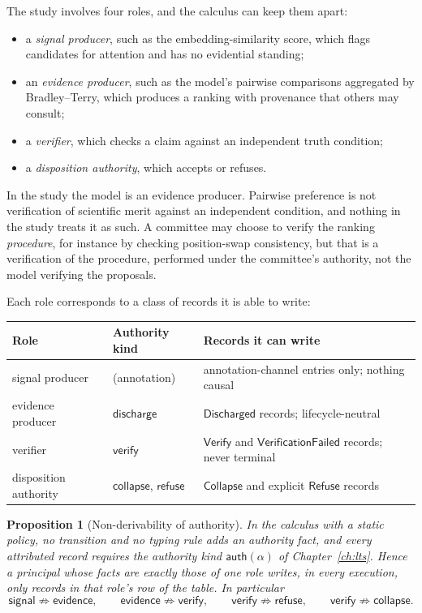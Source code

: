 \documentclass[11pt,openany]{book}
\newtheorem{proposition}[theorem]{Proposition}
\theoremstyle{remark}
\newcommand{\Refuse}{\mathsf{Refuse}}
\newcommand{\Verify}{\mathsf{Verify}}
\newcommand{\Collapse}{\mathsf{Collapse}}
\begin{document}
The study involves four roles, and the calculus can keep them apart:
\begin{itemize}[leftmargin=1.5em]
\item a \emph{signal producer}, such as the embedding-similarity score,
which flags candidates for attention and has no evidential standing;
\item an \emph{evidence producer}, such as the model's pairwise
comparisons aggregated by Bradley--Terry, which produces a ranking with
provenance that others may consult;
\item a \emph{verifier}, which checks a claim against an independent truth
condition;
\item a \emph{disposition authority}, which accepts or refuses.
\end{itemize}
In the study the model is an evidence producer. Pairwise preference is not
verification of scientific merit against an independent condition, and
nothing in the study treats it as such. A committee may choose to verify
the ranking \emph{procedure}, for instance by checking position-swap
consistency, but that is a verification of the procedure, performed under
the committee's authority, not the model verifying the proposals.

Each role corresponds to a class of records it is able to write:
\begin{center}
\small
\begin{tabular}{lll}
\toprule
Role & Authority kind & Records it can write\\
\midrule
signal producer & (annotation) & annotation-channel entries only; nothing causal\\
evidence producer & $\mathsf{discharge}$ & $\mathsf{Discharged}$ records; lifecycle-neutral\\
verifier & $\mathsf{verify}$ & $\Verify$ and $\mathsf{VerificationFailed}$ records; never terminal\\
disposition authority & $\mathsf{collapse}$, $\mathsf{refuse}$ & $\Collapse$ and explicit $\Refuse$ records\\
\bottomrule
\end{tabular}
\end{center}

\begin{proposition}[Non-derivability of authority]\label{prop:nonderiv}
In the calculus with a static policy, no transition and no typing rule
adds an authority fact, and every attributed record requires the
authority kind $\mathsf{auth}(\alpha)$ of Chapter~\ref{ch:lts}. Hence a
principal whose facts are exactly those of one role writes, in every
execution, only records in that role's row of the table. In particular
\[
\mathsf{signal}\not\Rightarrow\mathsf{evidence},\qquad
\mathsf{evidence}\not\Rightarrow\mathsf{verify},\qquad
\mathsf{verify}\not\Rightarrow\mathsf{refuse},\qquad
\mathsf{verify}\not\Rightarrow\mathsf{collapse}.
\]
\end{proposition}
\end{document}
